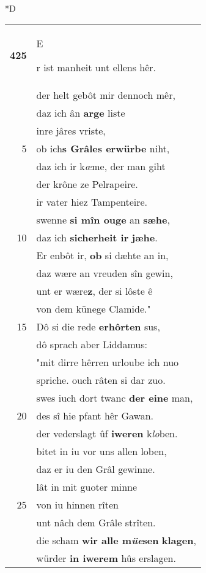 \documentclass[8pt,a4paper,notitlepage]{article}
\begin{document}
\begin{table}[ht]
\begin{minipage}[t]{0.5\linewidth}
\small
\begin{center}*D
\end{center}
\begin{tabular}{rl}
\textbf{425} & \begin{large}E\end{large}r ist manheit unt ellens hêr.\\ 
 & der helt gebôt mir dennoch mêr,\\ 
 & daz ich ân \textbf{arge} liste\\ 
 & inre jâres vriste,\\ 
5 & ob ich\textbf{s Grâles erwürbe} niht,\\ 
 & daz ich ir k\textit{œ}me, der man giht\\ 
 & der krône ze Pelrapeire.\\ 
 & ir vater hiez Tampenteire.\\ 
 & swenne \textbf{si mîn ouge} an \textbf{sæhe},\\ 
10 & daz ich \textbf{sicherheit ir} \textbf{jæhe}.\\ 
 & Er enbôt ir, \textbf{ob} si dæhte an in,\\ 
 & daz wære an vreuden sîn gewin,\\ 
 & unt er wære\textbf{z}, der si lôste ê\\ 
 & von dem künege Clamide."\\ 
15 & Dô si die rede \textbf{erhôrten} sus,\\ 
 & dô sprach aber Liddamus:\\ 
 & "mit dirre hêrren urloube ich nuo\\ 
 & spriche. ouch râten si dar zuo.\\ 
 & swes iuch dort twanc \textbf{der eine} man,\\ 
20 & des sî hie pfant hêr Gawan.\\ 
 & der vederslagt ûf \textbf{iweren} k\textit{lo}ben.\\ 
 & bitet in iu vor uns allen loben,\\ 
 & daz er iu den Grâl gewinne.\\ 
 & lât in mit guoter minne\\ 
25 & von iu hinnen rîten\\ 
 & unt nâch dem Grâle strîten.\\ 
 & die scham \textbf{wir alle m\textit{üe}sen} \textbf{klagen},\\ 
 & würder \textbf{in iwerem} hûs erslagen.\\ 

\end{tabular}
\end{minipage}
\end{table}
\end{document}

